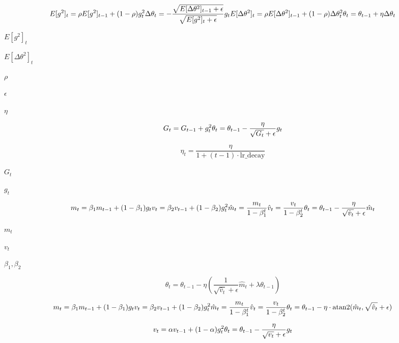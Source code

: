 \documentclass{article}
\begin{document}
\[E[g^2]_t = \rho E[g^2]_{t-1} + (1 - \rho) g_t^2 \\
\Delta\theta_t = -\frac{\sqrt{E[\Delta\theta^2]_{t-1} + \epsilon}}{\sqrt{E[g^2]_t + \epsilon}} g_t \\
E[\Delta\theta^2]_t = \rho E[\Delta\theta^2]_{t-1} + (1 - \rho) \Delta\theta_t^2 \\
\theta_t = \theta_{t-1} + \eta \Delta\theta_t
\]
\pagebreak

$E[g^2]_t$
\pagebreak

$E[\Delta\theta^2]_t$
\pagebreak

$\rho$
\pagebreak

$\epsilon$
\pagebreak

$\eta$
\pagebreak

\[G_t = G_{t-1} + g_t^2 \\
\theta_t = \theta_{t-1} - \frac{\eta}{\sqrt{G_t} + \epsilon} g_t
\]
\pagebreak

\[\eta_t = \frac{\eta}{1 + (t-1) \cdot \text{lr\_decay}}
\]
\pagebreak

$G_t$
\pagebreak

$g_t$
\pagebreak

\[m_t = \beta_1 m_{t-1} + (1 - \beta_1) g_t \\
v_t = \beta_2 v_{t-1} + (1 - \beta_2) g_t^2 \\
\hat{m}_t = \frac{m_t}{1 - \beta_1^t} \\
\hat{v}_t = \frac{v_t}{1 - \beta_2^t} \\
\theta_t = \theta_{t-1} - \frac{\eta}{\sqrt{\hat{v}_t} + \epsilon} \hat{m}_t
\]
\pagebreak

$m_t$
\pagebreak

$v_t$
\pagebreak

$\beta_1, \beta_2$
\pagebreak

\[\theta_t = \theta_{t-1} - \eta\left(\frac{1}{\sqrt{\hat{v}_t} + \epsilon}\hat{m}_t + \lambda\theta_{t-1}\right)
\]
\pagebreak

\[m_t = \beta_1 m_{t-1} + (1 - \beta_1) g_t \\
v_t = \beta_2 v_{t-1} + (1 - \beta_2) g_t^2 \\
\hat{m}_t = \frac{m_t}{1 - \beta_1^t} \\
\hat{v}_t = \frac{v_t}{1 - \beta_2^t} \\
\theta_t = \theta_{t-1} - \eta \cdot \text{atan2}(\hat{m}_t, \sqrt{\hat{v}_t} + \epsilon)
\]
\pagebreak

\[v_t = \alpha v_{t-1} + (1 - \alpha) g_t^2 \\
\theta_t = \theta_{t-1} - \frac{\eta}{\sqrt{v_t} + \epsilon} g_t
\]
\pagebreak
\end{document}
